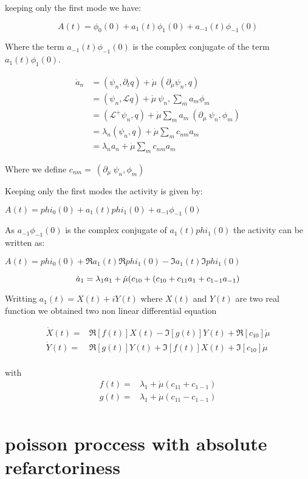 \documentclass[a4paper,12pt,twoside]{article}
\def \be {\begin{equation}}
\def \ee {\end{equation}}
\begin{document}
keeping only the first mode we have:

\be
A(t)=\phi_0(0) + a_1(t)\phi_1(0) +a_{-1}(t)\phi_{-1}(0)
\ee

Where the term $a_{-1}(t)\phi_{-1}(0)$ is the complex conjugate  of the term $a_1(t)\phi_1(0)$. 


\begin{align}
\dot{a}_n&=(\psi_n,\partial_tq) + \dot{\mu}\: (\partial_{\mu}\psi_n,q)   \nonumber \\
&=(\psi_n,\mathcal{L}q)  +   \dot{\mu}\:\psi_n,\sum_ma_m\phi_m\nonumber \\
&=(\mathcal{L}^+\psi_n,q)+ \dot{\mu}\sum_ma_m\:(\partial_{\mu}\:\psi_n,\phi_m) \nonumber \\
&=\lambda_n(\psi_n,q) +  \dot{\mu}\sum_mc_{nm}a_m \nonumber \\
&=\lambda_na_n   +  \dot{\mu}\sum_mc_{nm}a_m
\end{align}

Where we define $c_{nm} = \:(\partial_{\mu}\:\psi_n,\phi_m)$

Keeping only the first modes the activity is given by:

$A(t)= phi_0(0)+a_1(t)phi_1(0)+a_{-1}\phi_{-1}(0)$ 

As $a_{-1}\phi_{-1}(0)$ is the complex conjugate of $a_1(t)phi_1(0)$ the activity can be written as:

$A(t)= phi_0(0)+\Re{a_1(t)}\Re{phi_1(0)}-\Im{a_1(t)}\Im{phi_1(0)}$ 


\be
\dot{a}_1=\lambda_1 a_1 + \dot{\mu}(c_{10}+(c_{10}+c_{11}a_1+c_{1-1}a_{-1}) \nonumber \\
\ee

Writting $a_1(t)= X(t) +iY(t)$ where $X(t)$ and $Y(t)$ are two real function we obtained two non linear differential equation

\begin{align}
\dot{X}(t)=&\Re[f(t)]X(t)-\Im[g(t)]Y(t) +\Re[c_{10}]\dot{\mu}\\
\dot{Y}(t)=&\Re[g(t)]Y(t)+\Im[f(t)]X(t) +\Im[c_{10}]\dot{\mu}\\
\end{align}

with
\begin{align}
f(t)=&\lambda_1+ \dot{\mu}(c_{11}+c_{1-1})\\
g(t)=&\lambda_1+ \dot{\mu}(c_{11}-c_{1-1})\\
\end{align}

\section{poisson proccess with absolute refarctoriness}
\end{document}
